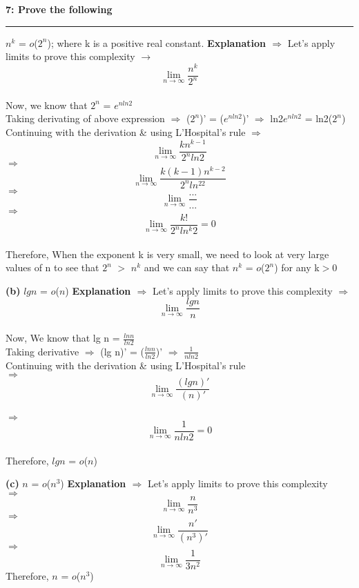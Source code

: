 \documentclass[11pt]{article}
\newcommand\question[3]{\vspace{.25in}\textbf{#1: #2}\vspace{.5em}\hrule\vspace{.10in}}
\renewcommand\part[1]{\vspace{.10in}\textbf{(#1)}}
\begin{document}

\question{7} {Prove the following}

\part{a} $n^k$ = $o$($2^n$); where k is a positive real constant.
\newline
\textbf{Explanation $\Rightarrow$} Let's apply limits to prove this complexity $\rightarrow$ \\
$$\lim_{n\to\infty} \frac{n^k}{2^n}$$ \\
Now, we know that $2^n$ = $e^{n ln 2}$ \\
Taking derivating of above expression $\Rightarrow$ ($2^n$)' = ($e^{n ln 2}$)' $\Rightarrow$ ln2$e^{nln2}$ = ln2($2^n$) \\
Continuing with the derivation \& using L'Hospital's rule $\Rightarrow$ 
$$\lim_{n\to\infty} \frac{kn^{k-1}}{2^nln2}$$ 
$\Rightarrow$ 
$$\lim_{n\to\infty} \frac{k(k-1)n^{k-2}}{2^nln^22}$$
$\Rightarrow$
$$\lim_{n\to\infty} \frac{. . .}{. . .}$$
$\Rightarrow$
$$\lim_{n\to\infty} \frac{k!}{2^nln^k2} = 0$$ \\
Therefore, When	the	exponent k is very small, we need to	look at very large values of	n to see	that $2^n$ $>$ $n^k$ and we can say that $n^k$ = $o$($2^n$) for any k$>$0

\part{b} $lg n$ = $o$($n$)
\newline
\textbf{Explanation $\Rightarrow$} Let's apply limits to prove this complexity $\Rightarrow$ \\
$$\lim_{n\to\infty} \frac{lg n}{n}$$ \\
Now, We know that lg n = $\frac{ln n}{ln 2}$ \newline \\
Taking derivative $\Rightarrow$ (lg n)' = ($\frac{ln n}{ln 2}$)' $\Rightarrow$ $\frac{1}{nln 2}$ \newline \\
Continuing with the derivation \& using L'Hospital's rule \\
$\Rightarrow$
$$\lim_{n\to\infty} \frac{(lg n)'}{(n)'}$$ \\
$\Rightarrow$
$$\lim_{n\to\infty} \frac{1}{n ln 2} = 0$$ \\
Therefore, $lg n$ = $o$($n$)

\part{c} $n$ = $o$($n^3$)
\newline
\textbf{Explanation $\Rightarrow$} Let's apply limits to prove this complexity \\
$\Rightarrow$ $$\lim_{n\to\infty} \frac{n}{n^3}$$ 
$\Rightarrow$ $$\lim_{n\to\infty} \frac{n'}{(n^3)'}$$ 
$\Rightarrow$ $$\lim_{n\to\infty} \frac{1}{3n^2}$$
Therefore, $n$ = $o$($n^3$)

\hrulefill
\end{document}
